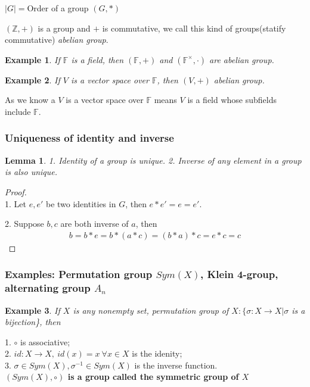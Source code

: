 \documentclass[11pt,a4paper]{article}
\newtheorem{lemma}{Lemma}
\newtheorem{example}{Example}
\begin{document}
$|G|= $Order of a group $(G,*)$

$(\mathbb{Z},+)$ is a group and $+$ is commutative, we call this kind of groups(statify commutative) \textit{abelian group}.
\begin{example}
If $\mathbb{F}$ is a field, then $(\mathbb{F},+)$ and $(\mathbb{F}^{\times},\cdot)$ are abelian group.
\end{example}
\begin{example}
If $V$ is a vector space over $\mathbb{F}$, then $(V,+)$ abelian group.
\end{example}
As we know a $V$ is a vector space over $\mathbb{F}$ means $V$ is a field whose subfields include $\mathbb{F}$.

\subsubsection{Uniqueness of identity and inverse}
\begin{lemma}
    1. Identity of a group is unique. 2. Inverse of any element in a group is also unique.
\end{lemma}
\begin{proof}
\quad\\
1. Let $e,e'$ be two identities in $G$, then $e*e'=e=e'$.

2. Suppose $b,c$ are both inverse of $a$, then
\begin{equation}
    \begin{aligned}
        b=b*e=b*(a*c)=(b*a)*c=e*c=c
    \end{aligned}
    \nonumber
\end{equation}
\end{proof}



\subsubsection{Examples: Permutation group $Sym(X)$, Klein 4-group, alternating group $A_n$}
\begin{example}
If $X$ is any nonempty set, permutation group of $X: \{\sigma:X \rightarrow X| \sigma$ is a bijection\}, then
\end{example}
1. $\circ$ is associative;\\
2. $id: X \rightarrow X,\ id(x)=x\ \forall x\in X$ is the idenity;\\
3. $\sigma\in Sym(X), \sigma^{-1}\in Sym(X)$ is the inverse function.\\
\textbf{$(Sym(X),\circ)$ is a group called the symmetric group of $X$}
\end{document}
